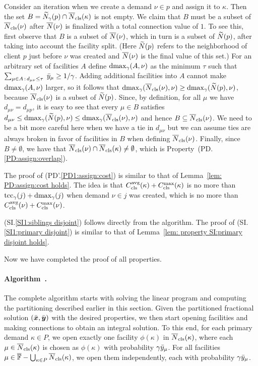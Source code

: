 
Consider an iteration when we create a demand $\nu\in p$ and assign it
to $\kappa$. Then the set $B={\widetilde N}_{\gamma}(p)\cap
{\overline{N}}_{\text{cls}}(\kappa)$ is not empty.  We claim that $B$ must be a subset
of ${\overline{N}}_{\text{cls}}(\nu)$ after ${\overline{N}}(\nu)$ is finalized with a total
connection value of $1$. To see this, first observe that $B$ is a
subset of ${\overline{N}}(\nu)$, which in turn is a subset of ${\widetilde N}(p)$,
after taking into account the facility split. (Here ${\widetilde N}(p)$
refers to the neighborhood of client $p$ just before $\nu$ was created
and ${\overline{N}}(\nu)$ is the final value of this set.)  For an arbitrary
set of facilities $A$ define $\text{dmax}_\gamma(A, \nu)$ as the minimum
$\tau$ such that $\sum_{\mu\in A {\,:\,} d_{\mu\nu} \leq
  \tau}\;{\bar y}_{\mu} \geq 1/\gamma$.  Adding additional facilities
into $A$ cannot make $\text{dmax}_\gamma(A, \nu)$ larger, so it follows that
$\text{dmax}_\gamma ({\overline{N}}_{\text{cls}}(\nu), \nu) \geq \text{dmax}_\gamma({\widetilde N}(p),
\nu)$, because ${\overline{N}}_{\text{cls}}(\nu)$ is a subset of ${\widetilde N}(p)$. Since,
by definition, for all $\mu$ we have $d_{\mu \nu} = d_{\mu p}$, it is
easy to see that every $\mu \in B$ satisfies $d_{\mu \nu} \leq
\text{dmax}_\gamma({\widetilde N}(p), \nu) \leq \text{dmax}_\gamma({\overline{N}}_{\text{cls}}(\nu),
\nu)$ and hence $B\subseteq {\overline{N}}_{\text{cls}}(\nu)$. We need to be a bit more
careful here when we have a tie in $d_{\mu\nu}$ but we can assume ties
are always broken in favor of facilities in $B$ when defining
${\overline{N}}_{\text{cls}}(\nu)$. Finally, since $B\neq\emptyset$, we have that
${\overline{N}}_{\text{cls}}(\nu)\cap {\overline{N}}_{\text{cls}}(\kappa)\neq\emptyset$, which is
Property~(PD.\ref{PD:assign:overlap}).

The proof of (PD'.\ref{PD1:assign:cost}) is similar to that of
Lemma~\ref{lem: PD:assign:cost holds}. The idea is that
$C_{\text{cls}}^{{\mbox{\scriptsize\rm avg}}}(\kappa) + C_{\text{cls}}^{\max}(\kappa)$ is no more than $\textrm{tcc}_\gamma(j) +
\text{dmax}_{\gamma}(j)$ when demand $\nu \in j$ was created, which is no
more than $C_{\text{cls}}^{{\mbox{\scriptsize\rm avg}}}(\nu) + C_{\text{cls}}^{\max}(\nu)$.

(SI.\ref{SI1:siblings disjoint}) follows directly from the
algorithm. The proof of (SI.\ref{SI1:primary disjoint}) is similar to
that of Lemma~\ref{lem: property SI:primary disjoint holds}.

Now we have completed the proof of all properties.

\paragraph{Algorithm~{\EBGS}.}
The complete algorithm starts with solving the linear program and
computing the partitioning described earlier in this section.
Given the partitioned fractional solution $(\bar{\boldsymbol{x}},
\bar{\boldsymbol{y}})$ with the desired properties, we then start opening
facilities and making connections to obtain an integral
solution. To this end, for each primary demand $\kappa\in P$,
we open exactly one facility $\phi(\kappa)$ in ${\overline{N}}_{\text{cls}}(\kappa)$,
where each $\mu\in{\overline{N}}_{\text{cls}}(\kappa)$ is chosen as $\phi(\kappa)$ with probability
$\gamma{\bar y}_{\mu}$. For all facilities
 $\mu\in\overline{\mathbb{F}} - \bigcup_{\kappa\in P}{\overline{N}}_{\text{cls}}(\kappa)$,
we open them independently, each with
probability $\gamma{\bar y}_{\mu}$. 

